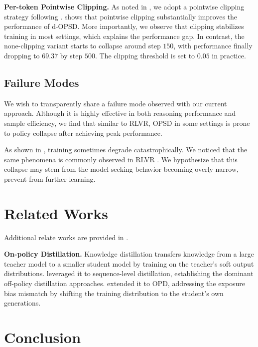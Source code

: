 \documentclass{llmxive}
\begin{document}
\textbf{Per-token Pointwise Clipping. } As noted in , we adopt a pointwise clipping strategy following \citep{zhao2026self}.  shows that pointwise clipping substantially improves the performance of d-OPSD. More importantly, we observe that clipping stabilizes training in most settings, which explains the performance gap. In contrast, the none-clipping variant starts to collapse around step $150$, with performance finally dropping to $69.37$ by step $500$. The clipping threshold is set to $0.05$ in practice.



\subsection{Failure Modes} \label{sec4.5}

We wish to transparently share a failure mode observed with our current approach. Although it is highly effective in both reasoning performance and sample efficiency, we find that similar to RLVR, OPSD in some settings is prone to policy collapse after achieving peak performance. 

As shown in , training sometimes degrade catastrophically. We noticed that the same phenomena is commonly observed in RLVR \citep{deng2025grpo, bai2025m}. We hypothesize that this collapse may stem from the model-seeking behavior \citep{agarwal2024policy} becoming overly narrow, prevent from further learning.

\section{Related Works}


Additional relate works are provided in .

\textbf{On-policy Distillation. } Knowledge distillation \citep{hinton2015distilling} transfers knowledge from a large teacher model to a smaller student model by training on the teacher's soft output distributions. \citet{kim2016sequence, jiao2020tinybert, wang2020minilm} leveraged it to sequence-level distillation, establishing the dominant off-policy distillation approaches. \citep{gu2024minillm, agarwal2024policy, lu2025onpolicydistillation, yang2026learning} extended it to OPD, addressing the exposure bias \citep{bengio2015scheduled} mismatch by shifting the training distribution to the student's own generations.


\section{Conclusion}
\end{document}
